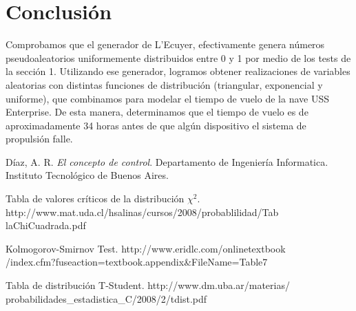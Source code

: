 \documentclass[10pt,journal,compsoc]{IEEEtran}
\begin{document}
\section{Conclusi\'on}
Comprobamos que el generador de L'Ecuyer, efectivamente genera n\'umeros pseudoaleatorios uniformemente distribuidos
entre 0 y 1 por medio de los tests de la secci\'on 1. Utilizando ese generador, logramos obtener realizaciones
de variables aleatorias con distintas funciones de distribuci\'on (triangular, exponencial y uniforme), que combinamos para modelar
el tiempo de vuelo de la nave USS Enterprise. De esta manera, determinamos que el tiempo de vuelo es de aproximadamente 34 horas antes
de que alg\'un dispositivo el sistema de propulsi\'on falle.

\begin{thebibliography}{1}

D\'iaz, A. R. \emph{El concepto de control}. Departamento de Ingenier\'ia Informatica. 
Instituto Tecnol\'ogico de Buenos Aires.

Tabla de valores cr\'iticos de la distribuci\'on $\chi^2$. http://www.mat.uda.cl/hsalinas/cursos/2008/probablilidad/Tab\\laChiCuadrada.pdf

Kolmogorov-Smirnov Test. http://www.eridlc.com/onlinetextbook\\/index.cfm?fuseaction=textbook.appendix\&FileName=Table7

Tabla de distribuci\'on T-Student. http://www.dm.uba.ar/materias/\\probabilidades\_estadistica\_C/2008/2/tdist.pdf

\end{thebibliography}
\end{document}
